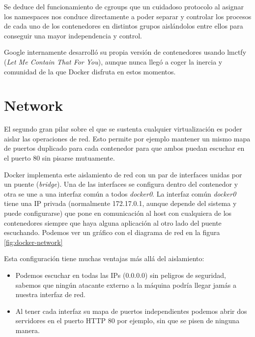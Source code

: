 Se deduce del funcionamiento de cgroups que un cuidadoso protocolo al asignar los namespaces nos conduce directamente a poder separar y controlar los procesos de cada uno de los contenedores en distintos grupos aislándolos entre ellos para conseguir una mayor independencia y control.

Google internamente desarrolló su propia versión de contenedores usando lmctfy\cite{lmctfy} (\emph{Let Me Contain That For You}), aunque nunca llegó a coger la inercia y comunidad de la que Docker disfruta en estos momentos.

\section{Network}
\label{sec:docker-network}

El segundo gran pilar sobre el que se sustenta cualquier virtualización es poder aislar las operaciones de red. Esto permite por ejemplo mantener un mismo mapa de puertos duplicado para cada contenedor para que ambos puedan escuchar en el puerto 80 sin pisarse mutuamente.

Docker implementa este aislamiento de red con un par de interfaces\cite{dockernetworking} unidas por un puente (\emph{bridge}). Una de las interfaces se configura dentro del contenedor y otra se une a una interfaz común a todos \emph{docker0}. La interfaz común \emph{docker0} tiene una IP privada (normalmente 172.17.0.1, aunque depende del sistema y puede configurarse) que pone en comunicación al host con cualquiera de los contenedores siempre que haya alguna aplicación al otro lado del puente escuchando. Podemos ver un gráfico con el diagrama de red en la figura \ref{fig:docker-network}

Esta configuración tiene muchas ventajas más allá del aislamiento:
\begin{itemize}
    \item Podemos escuchar en todas las IPs (0.0.0.0) sin peligros de seguridad, sabemos que ningún atacante externo a la máquina podría llegar jamás a nuestra interfaz de red.
    \item Al tener cada interfaz su mapa de puertos independientes podemos abrir dos servidores en el puerto HTTP 80 por ejemplo, sin que se pisen de ninguna manera.
\end{itemize}

